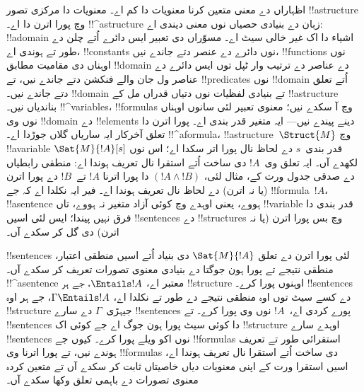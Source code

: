 \documentclass[../../../include/open-logic-section]{subfiles}
\begin{document}


اظہاراں دے معنی متعین کرنا معنویات دا کم اے۔ معنویات دا مرکزی
تصور !!a{structure} وچ پورا اترن دا اے۔ !!^a{structure} زبان دے
بنیادی حصیاں نوں معنی دیندی اے: !!a{domain} اشیاء دا اک غیر خالی
سیٹ اے۔ مسوّراں دی تعبیر ایس دائرے اُتے چلن دے طور تے ہوندی اے،
!!{constant}s نوں دائرے دے عنصر دتے جاندے نیں، !!{function}s نوں
اوہناں دی مقامیت مطابق !!{domain} دے عناصر دے ترتیب وار ٹپل توں
ایس دائرے دے عناصر ول جان والے فنکشن دتے جاندے نیں، تے
!!{predicate}s نوں !!{domain} اُتے تعلق دتے جاندے نیں۔
!!{domain} تے بنیادی لفظیات نوں دتیاں قدراں مل کے !!a{structure}
بناندیاں نیں۔ !!^{variable}s، !!{formula}s وچ آ سکدے نیں؛ معنوی
تعبیر لئی سانوں اوہناں نوں وی !!{domain} دے !!{element}s دینے پیندے نیں---
ایہ متغیر قدر بندی اے۔ پورا اترن دا تعلق آخرکار ایہ ساریاں گلاں
جوڑدا اے۔ !!^a{formula}، !!a{structure}~$\Struct{M}$ وچ
!!a{variable} قدر بندی~$s$ دے لحاظ نال پورا اتر سکدا اے؛
اس نوں $\Sat{M}{!A}[s]$ لکھدے آں۔ ایہ تعلق وی~$!A$ دی ساخت
اُتے استقرا نال تعریف ہوندا اے: منطقی رابطیاں دے صدقی جدول
ورت کے، مثال لئی، $(!A \land !B)$ دا پورا اترنا $!A$ تے~$!B$
دے پورا اترن (یا نہ اترن) دے لحاظ نال تعریف ہوندا اے۔ فیر
ایہ نکلدا اے کہ جے !!{formula}~$!A$، !!a{sentence} ہووے،
یعنی اوہدے وچ کوئی آزاد متغیر نہ ہووے، تاں !!{variable} قدر بندی
دا فرق نہیں پیندا؛ ایس لئی اسیں !!{sentence}s دے !!{structure}s
وچ بس پورا اترن (یا نہ اترن) دی گل کر سکدے آں۔

!!{sentence}s لئی پورا اترن دے تعلق $\Sat{M}{!A}$ دی بنیاد اُتے
اسیں منطقی اعتبار، منطقی نتیجے تے پورا ہون جوگتا دے بنیادی معنوی
تصورات تعریف کر سکدے آں۔ !!^a{sentence} معتبر اے، $\Entails !A$،
جے ہر !!{structure} اوہنوں پورا کرے۔ !!{sentence}s دے کسے سیٹ توں
اوہ منطقی نتیجے دے طور تے نکلدا اے، $\Gamma \Entails !A$، جے ہر
اوہ !!{structure} جیہڑی~$\Gamma$ دے سارے !!{sentence}s پورے کردی
اے،~$!A$ نوں وی پورا کرے۔ تے !!{sentence}s دا کوئی سیٹ پورا ہون
جوگ اے جے کوئی اک !!{structure} اوہدے سارے !!{sentence}s نوں
اکو ویلے پورا کرے۔ کیوں جے !!{formula}s استقرائی طور تے تعریف
ہوندے نیں، تے پورا اترنا وی !!{formula}s دی ساخت اُتے استقرا
نال تعریف ہوندا اے، اسیں استقرا ورت کے اپنی معنویات دیاں خاصیتاں
ثابت کر سکدے آں تے متعین کردہ معنوی تصورات دے باہمی تعلق وکھا
سکدے آں۔
\end{document}
